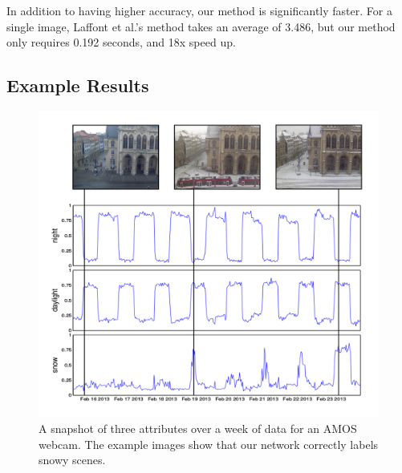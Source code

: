 \documentclass[10pt,twocolumn,letterpaper]{article}
\newcommand{\tblref}[1]{Table~\ref{tbl:#1}}
\begin{document}

In addition to having higher accuracy, our method is significantly
faster.  For a single image, Laffont et al.'s method takes an
average of 3.486, but our method only requires 0.192 seconds, and 18x speed up. 

\subsection{Example Results}

\begin{figure}[t]
	\centering
		\includegraphics[width=\linewidth, trim= 5mm 15mm 0mm 10mm]{figs/attr_compare.pdf}
		\caption{A snapshot of three attributes over a week of data for
             an AMOS webcam.  The example images show that our network 
             correctly labels snowy scenes.}
		\label{fig:attrcmp}
\end{figure}
\end{document}

